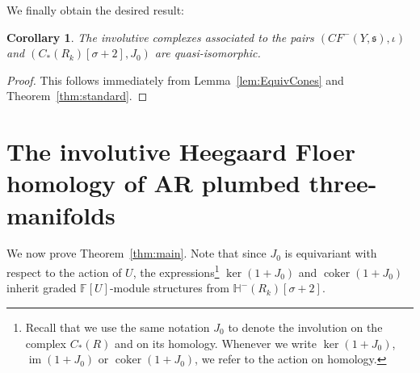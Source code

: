 \documentclass[11 pt]{amsart}
\newtheorem {corollary}[theorem]{Corollary}
\theoremstyle{remark}
\DeclareMathOperator{\coker}{coker}
\DeclareMathOperator{\im}{im}
\def\s{\mathfrak s}
\def\ff {{\mathbb{F}}}
\def\ker {{\operatorname{ker}}}
\def\He{\mathbb{H}}
\def\CF {\mathit{CF}}
\newcommand \CFm {\CF^-}
\def\inv{\iota}
\begin{document}
We finally obtain the desired result:
\begin{corollary}\label{lemequiv2}
The involutive complexes associated to the pairs $(\CFm(Y, \s), \inv)$ and $(C_*(R_k)[\sigma+2], J_0)$ are quasi-isomorphic. 
\end{corollary}
\begin{proof}
This follows immediately from Lemma~\ref{lem:EquivCones} and Theorem~\ref{thm:standard}. 
\end{proof}




\section{The involutive Heegaard Floer homology of AR plumbed three-manifolds}
\label{sec:hfiAR}
We now prove Theorem~\ref{thm:main}. Note that since $J_0$ is equivariant with respect to the action of $U$, the expressions\footnote{Recall that we use the same notation $J_0$ to denote the involution on the complex $C_*(R)$ and on its homology. Whenever we write   $\ker (1 + J_0)$, $\im (1 + J_0)$ or $\coker (1 + J_0)$, we refer to the action on homology.} $\ker (1 + J_0)$ and $\coker (1 + J_0)$ inherit graded $\ff[U]$-module structures from $\He^-(R_k)[\sigma+2]$. 
\end{document}
